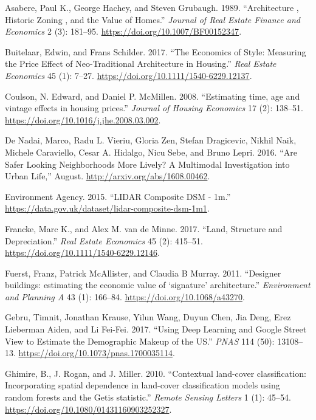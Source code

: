 \documentclass[]{article}
\begin{document}
\leavevmode\hypertarget{ref-Asabere1989}{}%
Asabere, Paul K., George Hachey, and Steven Grubaugh. 1989.
``Architecture , Historic Zoning , and the Value of Homes.''
\emph{Journal of Real Estate Finance and Economics} 2 (3): 181--95.
\url{https://doi.org/10.1007/BF00152347}.

\leavevmode\hypertarget{ref-Buitelaar2017}{}%
Buitelaar, Edwin, and Frans Schilder. 2017. ``The Economics of Style:
Measuring the Price Effect of Neo-Traditional Architecture in Housing.''
\emph{Real Estate Economics} 45 (1): 7--27.
\url{https://doi.org/10.1111/1540-6229.12137}.

\leavevmode\hypertarget{ref-Coulson2008}{}%
Coulson, N. Edward, and Daniel P. McMillen. 2008. ``Estimating time, age
and vintage effects in housing prices.'' \emph{Journal of Housing
Economics} 17 (2): 138--51.
\url{https://doi.org/10.1016/j.jhe.2008.03.002}.

\leavevmode\hypertarget{ref-Nadai2016}{}%
De Nadai, Marco, Radu L. Vieriu, Gloria Zen, Stefan Dragicevic, Nikhil
Naik, Michele Caraviello, Cesar A. Hidalgo, Nicu Sebe, and Bruno Lepri.
2016. ``Are Safer Looking Neighborhoods More Lively? A Multimodal
Investigation into Urban Life,'' August.
\url{http://arxiv.org/abs/1608.00462}.

\leavevmode\hypertarget{ref-EnvironmentAgency2015}{}%
Environment Agency. 2015. ``LIDAR Composite DSM - 1m.''
\url{https://data.gov.uk/dataset/lidar-composite-dsm-1m1}.

\leavevmode\hypertarget{ref-Francke2017a}{}%
Francke, Marc K., and Alex M. van de Minne. 2017. ``Land, Structure and
Depreciation.'' \emph{Real Estate Economics} 45 (2): 415--51.
\url{https://doi.org/10.1111/1540-6229.12146}.

\leavevmode\hypertarget{ref-Fuerst2011}{}%
Fuerst, Franz, Patrick McAllister, and Claudia B Murray. 2011.
``Designer buildings: estimating the economic value of `signature'
architecture.'' \emph{Environment and Planning A} 43 (1): 166--84.
\url{https://doi.org/10.1068/a43270}.

\leavevmode\hypertarget{ref-Gebru2017}{}%
Gebru, Timnit, Jonathan Krause, Yilun Wang, Duyun Chen, Jia Deng, Erez
Lieberman Aiden, and Li Fei-Fei. 2017. ``Using Deep Learning and Google
Street View to Estimate the Demographic Makeup of the US.'' \emph{PNAS}
114 (50): 13108--13. \url{https://doi.org/10.1073/pnas.1700035114}.

\leavevmode\hypertarget{ref-Ghimire2010a}{}%
Ghimire, B., J. Rogan, and J. Miller. 2010. ``Contextual land-cover
classification: Incorporating spatial dependence in land-cover
classification models using random forests and the Getis statistic.''
\emph{Remote Sensing Letters} 1 (1): 45--54.
\url{https://doi.org/10.1080/01431160903252327}.
\end{document}
